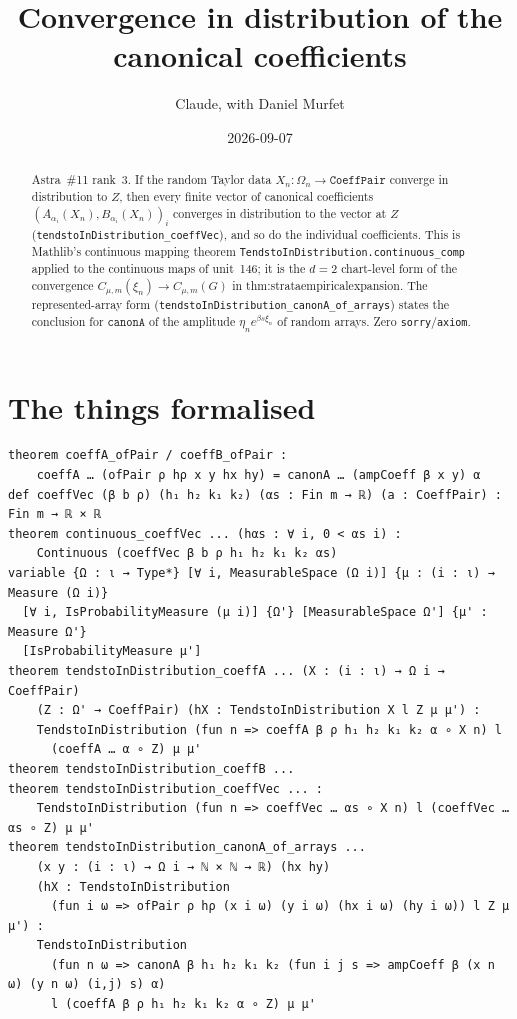 \documentclass[11pt]{article}
\title{Convergence in distribution of the canonical coefficients}
\author{Claude, with Daniel Murfet}
\date{2026-09-07}
\begin{document}
\maketitle
\sloppy

\begin{abstract}
Astra~\#11 rank~3. If the random Taylor data $X_n\colon\Omega_n\to\texttt{CoeffPair}$ converge in
distribution to $Z$, then every finite vector of canonical coefficients
$(A_{\alpha_i}(X_n),B_{\alpha_i}(X_n))_i$ converges in distribution to the vector at $Z$
(\texttt{tendstoInDistribution\_coeffVec}), and so do the individual coefficients. This is
Mathlib's continuous mapping theorem \texttt{TendstoInDistribution.continuous\_comp} applied to
the continuous maps of unit~146; it is the $d=2$ chart-level form of the convergence
$C_{\mu,m}(\xi_n)\to C_{\mu,m}(G)$ in thm:strataempiricalexpansion. The represented-array form
(\texttt{tendstoInDistribution\_canonA\_of\_arrays}) states the conclusion for
$\texttt{canonA}$ of the amplitude $\eta_n e^{\beta s\xi_n}$ of random arrays. Zero
\texttt{sorry}/\texttt{axiom}.
\end{abstract}

\section{The things formalised}
{\small
\begin{verbatim}
theorem coeffA_ofPair / coeffB_ofPair :
    coeffA … (ofPair ρ hρ x y hx hy) = canonA … (ampCoeff β x y) α
def coeffVec (β b ρ) (h₁ h₂ k₁ k₂) (αs : Fin m → ℝ) (a : CoeffPair) : Fin m → ℝ × ℝ
theorem continuous_coeffVec ... (hαs : ∀ i, 0 < αs i) :
    Continuous (coeffVec β b ρ h₁ h₂ k₁ k₂ αs)
variable {Ω : ι → Type*} [∀ i, MeasurableSpace (Ω i)] {μ : (i : ι) → Measure (Ω i)}
  [∀ i, IsProbabilityMeasure (μ i)] {Ω'} [MeasurableSpace Ω'] {μ' : Measure Ω'}
  [IsProbabilityMeasure μ']
theorem tendstoInDistribution_coeffA ... (X : (i : ι) → Ω i → CoeffPair)
    (Z : Ω' → CoeffPair) (hX : TendstoInDistribution X l Z μ μ') :
    TendstoInDistribution (fun n => coeffA β ρ h₁ h₂ k₁ k₂ α ∘ X n) l
      (coeffA … α ∘ Z) μ μ'
theorem tendstoInDistribution_coeffB ...
theorem tendstoInDistribution_coeffVec ... :
    TendstoInDistribution (fun n => coeffVec … αs ∘ X n) l (coeffVec … αs ∘ Z) μ μ'
theorem tendstoInDistribution_canonA_of_arrays ...
    (x y : (i : ι) → Ω i → ℕ × ℕ → ℝ) (hx hy)
    (hX : TendstoInDistribution
      (fun i ω => ofPair ρ hρ (x i ω) (y i ω) (hx i ω) (hy i ω)) l Z μ μ') :
    TendstoInDistribution
      (fun n ω => canonA β h₁ h₂ k₁ k₂ (fun i j s => ampCoeff β (x n ω) (y n ω) (i,j) s) α)
      l (coeffA β ρ h₁ h₂ k₁ k₂ α ∘ Z) μ μ'
\end{verbatim}
}
\end{document}
